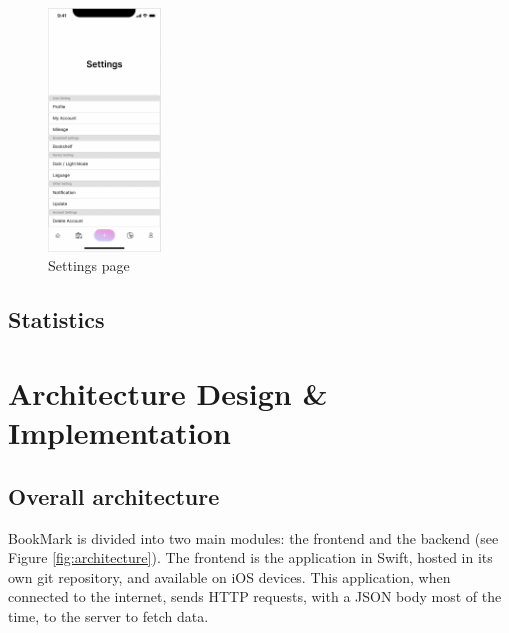 \documentclass[conference]{IEEEtran}
\begin{document}
\begin{figure}[h]
    \centering
    \includegraphics[width=3cm]{Resources/Specifications/settings.png}
    \caption{Settings page}
    \label{fig:settings}
\end{figure}

\subsection{Statistics}


\section{Architecture Design \& Implementation}
\subsection{Overall architecture}



BookMark is divided into two main modules: the frontend and the backend (see Figure  \ref{fig:architecture}). The frontend is the application in Swift, hosted in its own git repository, and available on iOS devices. This application, when connected to the internet, sends HTTP requests, with a JSON body most of the time, to the server to fetch data.
\end{document}
